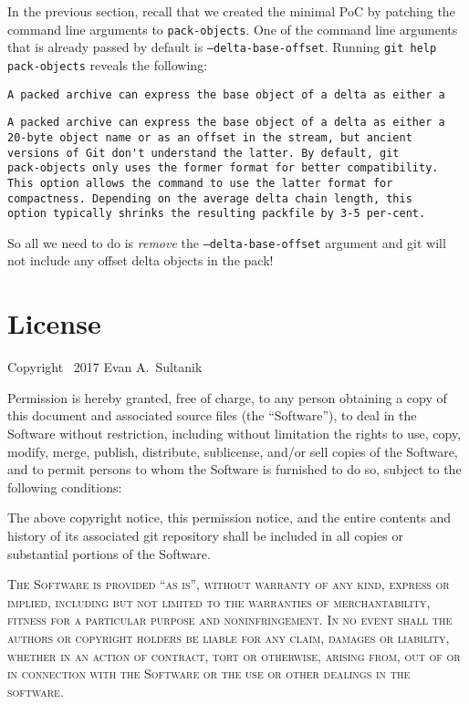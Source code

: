 \documentclass{article}
\begin{document}
In the previous section, recall that we created the minimal PoC by
patching the command line arguments to \texttt{pack-objects}.  One of
the command line arguments that is already passed by default
is \texttt{--delta-base-offset}. Running \texttt{git help
pack-objects} reveals the following:
\begin{center}
{\footnotesize{}\hbox{\verb|A packed archive can express the base object of a delta as either a|}
\begin{minipage}{\wd9}
\begin{verbatim}
A packed archive can express the base object of a delta as either a
20-byte object name or as an offset in the stream, but ancient
versions of Git don't understand the latter. By default, git
pack-objects only uses the former format for better compatibility.
This option allows the command to use the latter format for
compactness. Depending on the average delta chain length, this
option typically shrinks the resulting packfile by 3-5 per-cent.
\end{verbatim}
\end{minipage}}
\end{center}
So all we need to do is \emph{remove} the \texttt{--delta-base-offset}
argument and git will not include any offset delta objects in the
pack!

\section{License}

Copyright \textcopyright\ 2017 Evan A.~Sultanik

Permission is hereby granted, free of charge, to any person obtaining a copy
of this document and associated source files (the ``Software''), to deal
in the Software without restriction, including without limitation the rights
to use, copy, modify, merge, publish, distribute, sublicense, and/or sell
copies of the Software, and to permit persons to whom the Software is
furnished to do so, subject to the following conditions:

The above copyright notice, this permission notice, and the entire
contents and history of its associated git repository shall be
included in all copies or substantial portions of the Software.

\textsc{The Software is provided ``as is'', without warranty of any kind, express or implied, including but not limited to the warranties of merchantability, fitness for a particular purpose and noninfringement. In no event shall the authors or copyright holders be liable for any claim, damages or liability, whether in an action of contract, tort or otherwise, arising from, out of or in connection with the Software or the use or other dealings in the software.}
\end{document}
